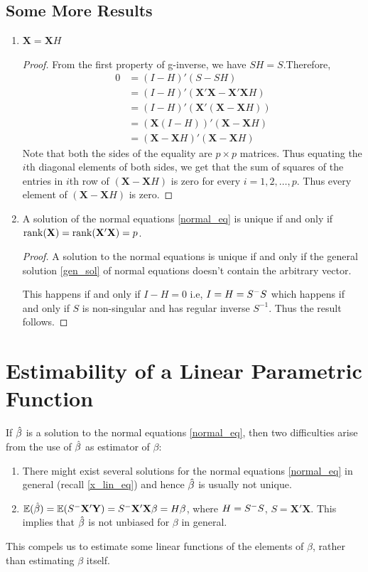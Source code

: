 \documentclass[10pt, a4paper]{article}
\begin{document}
\subsection{Some More Results}
\begin{enumerate}[1., start = 4]
	\item \( \mathbf{X} = \mathbf{X}H \)
\begin{proof}
	From the first property of g-inverse, we have \( SH = S \).Therefore,
	\begin{align*}
		0 &= (I-H)'(S-SH) \\
		  &= (I-H)'(\mathbf{X}'\mathbf{X} - \mathbf{X}'\mathbf{X}H) \\
		  &= (I-H)'(\mathbf{X}'(\mathbf{X}-\mathbf{X}H)) \\
		  &= (\mathbf{X}(I-H))'(\mathbf{X}-\mathbf{X}H) \\
		  &= (\mathbf{X}-\mathbf{X}H)'(\mathbf{X}-\mathbf{X}H)
	\end{align*}
Note that both the sides of the equality are \( p \times p \) matrices.
Thus equating the \( i \)th diagonal elements of both sides, we get that the sum of squares of the entries in \( i \)th row of \( (\mathbf{X}-\mathbf{X}H) \) is zero for every \( i = 1, 2, \dots, p \).
Thus every element of \( (\mathbf{X}-\mathbf{X}H) \) is zero.
\end{proof}

	\item A solution of the normal equations \eqref{normal_eq} is unique if and only if \( \operatorname{rank}(\mathbf{X}) = \operatorname{rank}(\mathbf{X}'\mathbf{X}) = p \).
\begin{proof}
	A solution to the normal equations is unique if and only if the general solution \eqref{gen_sol} of normal equations doesn't contain the arbitrary vector.

	This happens if and only if \( I-H = 0 \) i.e, \( I = H = S^{-}S \) which happens if and only if \( S \) is non-singular and has regular inverse \( S^{-1} \). Thus the result follows.
\end{proof}

\end{enumerate}

\section{Estimability of a Linear Parametric Function}
If \( \hat{\beta} \) is a solution to the normal equations \eqref{normal_eq}, then two difficulties arise from the use of \( \hat{\beta} \) as estimator of \( \beta \):
\begin{enumerate}[1.]
	\item There might exist several solutions for the normal equations \eqref{normal_eq} in general (recall \eqref{x_lin_eq}) and hence \( \hat{\beta} \) is usually not unique.
	\item \( \mathbb{E}(\hat{\beta}) = \mathbb{E}(S^{-}\mathbf{X}'\mathbf{Y}) = S^{-}\mathbf{X}'\mathbf{X} \beta = H\beta \), where \( H = S^{-}S \), \( S = \mathbf{X}'\mathbf{X} \). This implies that \( \hat{\beta} \) is not unbiased for \( \beta \) in general.
\end{enumerate}
This compels us to estimate some linear functions of the elements of \( \beta \), rather than estimating \( \beta \) itself.
\end{document}

